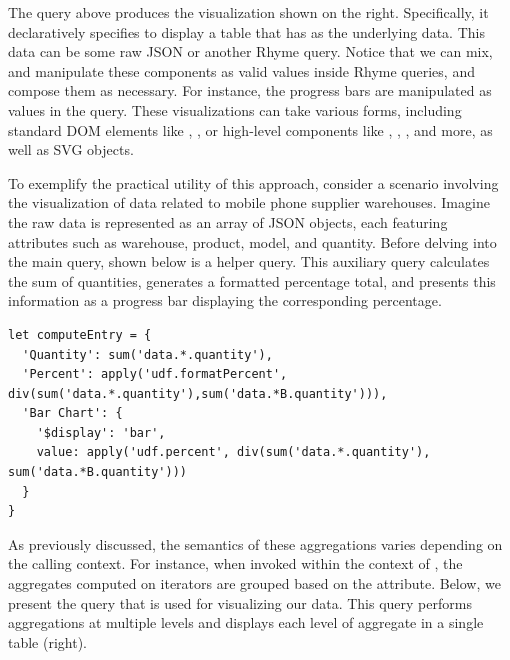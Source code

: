 \documentclass[runningheads]{llncs}
\newcommand{\lang}{Rhyme}
\begin{document}
The query above produces the visualization shown on the right.
Specifically, it declaratively specifies to display a table that
has  as the underlying data.
This data can be some raw JSON or another \lang{} query.
Notice that we can mix, and manipulate these components as valid
values inside \lang{} queries, and compose them as necessary.
For instance, the progress bars are manipulated as values in the query.
These visualizations can take various forms, including standard DOM elements
like , , or high-level components like
, , , and more,
as well as SVG objects.

To exemplify the practical utility of this approach, consider a scenario involving
the visualization of data related to mobile phone supplier warehouses.
Imagine the raw data is represented as an array of JSON objects, each featuring attributes
such as warehouse, product, model, and quantity.
Before delving into the main query, shown below is a helper query.
This auxiliary query calculates the sum of quantities, generates a formatted percentage
total, and presents this information as a progress bar displaying the corresponding percentage.

\begin{lstlisting}[style=JavaScript,columns=flexible]
let computeEntry = {
  'Quantity': sum('data.*.quantity'),
  'Percent': apply('udf.formatPercent', div(sum('data.*.quantity'),sum('data.*B.quantity'))),
  'Bar Chart': {
    '$display': 'bar',
    value: apply('udf.percent', div(sum('data.*.quantity'), sum('data.*B.quantity')))
  }
}
\end{lstlisting}

As previously discussed, the semantics of these aggregations varies depending on the
calling context.
For instance, when invoked within the context of , the
aggregates computed on \inline{*} iterators are grouped based on the  attribute.
Below, we present the query that is used for visualizing our data.
This query performs aggregations at multiple levels and displays each level of
aggregate in a single table (right).
\end{document}
